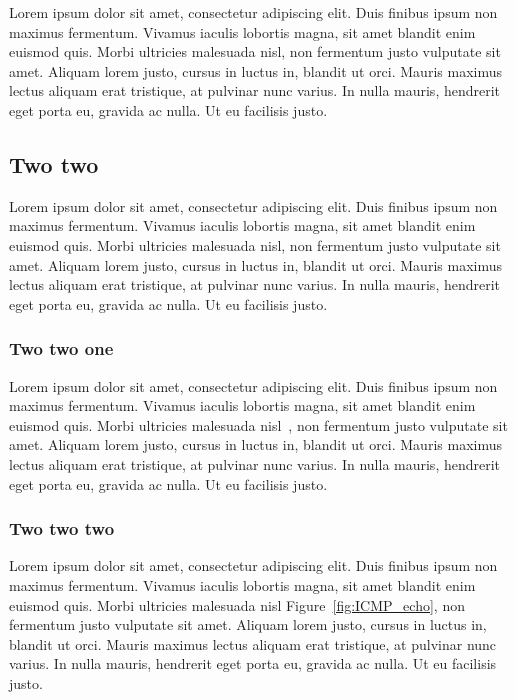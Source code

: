 
Lorem ipsum dolor sit amet, consectetur adipiscing elit. Duis finibus ipsum non maximus fermentum. Vivamus iaculis lobortis magna, sit amet blandit enim euismod quis. Morbi ultricies malesuada nisl, non fermentum justo vulputate sit amet. Aliquam lorem justo, cursus in luctus in, blandit ut orci. Mauris maximus lectus aliquam erat tristique, at pulvinar nunc varius. In nulla mauris, hendrerit eget porta eu, gravida ac nulla. Ut eu facilisis justo. \newline

\subsection{Two two}
\label{sub:two_two}

Lorem ipsum dolor sit amet, consectetur adipiscing elit. Duis finibus ipsum non maximus fermentum. Vivamus iaculis lobortis magna, sit amet blandit enim euismod quis. Morbi ultricies malesuada nisl, non fermentum justo vulputate sit amet. Aliquam lorem justo, cursus in luctus in, blandit ut orci. Mauris maximus lectus aliquam erat tristique, at pulvinar nunc varius. In nulla mauris, hendrerit eget porta eu, gravida ac nulla. Ut eu facilisis justo.

\subsubsection{Two two one}
\label{ssub:two_two_one}

Lorem ipsum dolor sit amet, consectetur adipiscing elit. Duis finibus ipsum non maximus fermentum. Vivamus iaculis lobortis magna, sit amet blandit enim euismod quis. Morbi ultricies malesuada nisl~\cite{Comer2005aa}, non fermentum justo vulputate sit amet. Aliquam lorem justo, cursus in luctus in, blandit ut orci. Mauris maximus lectus aliquam erat tristique, at pulvinar nunc varius. In nulla mauris, hendrerit eget porta eu, gravida ac nulla. Ut eu facilisis justo.



\subsubsection{Two two two}
\label{ssub:two_two_two}

Lorem ipsum dolor sit amet, consectetur adipiscing elit. Duis finibus ipsum non maximus fermentum. Vivamus iaculis lobortis magna, sit amet blandit enim euismod quis. Morbi ultricies malesuada nisl Figure~\ref{fig:ICMP_echo}, non fermentum justo vulputate sit amet. Aliquam lorem justo, cursus in luctus in, blandit ut orci. Mauris maximus lectus aliquam erat tristique, at pulvinar nunc varius. In nulla mauris, hendrerit eget porta eu, gravida ac nulla. Ut eu facilisis justo.


